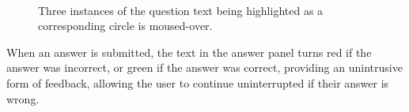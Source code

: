 \documentclass[12pt,twoside,notitlepage,xetex]{report}
\begin{document}
\begin{center}
\begin{figure}[H]
\begin{center}
\\
\vspace{0.5cm}
\end{center}
\caption{Three instances of the question text being highlighted as a corresponding circle is moused-over.}
\label{fig:Highlighting}
\end{figure}
\end{center}

When an answer is submitted, the text in the answer panel turns red if the answer was incorrect, or green if the answer was correct, providing an unintrusive form of feedback, allowing the user to continue uninterrupted if their answer is wrong.
\end{document}
